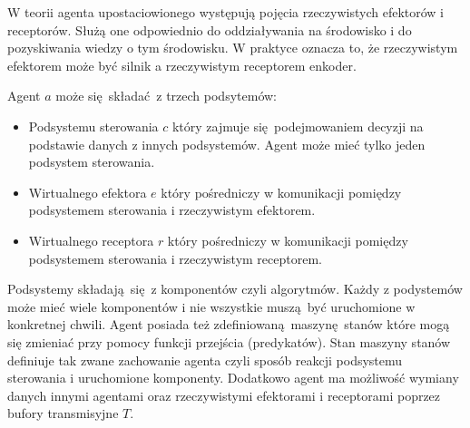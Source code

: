 W teorii agenta upostaciowionego występują pojęcia rzeczywistych efektorów i receptorów. Służą one odpowiednio do oddziaływania na środowisko i do pozyskiwania wiedzy o tym środowisku. W praktyce oznacza to, że rzeczywistym efektorem może być silnik a rzeczywistym receptorem enkoder. 

Agent $a$ może się składać z trzech podsytemów:
\begin{itemize}
	\item Podsystemu sterowania $c$ który zajmuje się podejmowaniem decyzji na podstawie danych z innych podsystemów. Agent może mieć tylko jeden podsystem sterowania.
	\item Wirtualnego efektora $e$ który pośredniczy w komunikacji pomiędzy podsystemem sterowania i rzeczywistym efektorem.
	\item Wirtualnego receptora $r$ który pośredniczy w komunikacji pomiędzy podsystemem sterowania i rzeczywistym receptorem.
\end{itemize}
Podsystemy składają się z komponentów czyli algorytmów. Każdy z podystemów może mieć wiele komponentów i nie wszystkie muszą być uruchomione w konkretnej chwili. Agent posiada też zdefiniowaną maszynę stanów które mogą się zmieniać przy pomocy funkcji przejścia (predykatów). Stan maszyny stanów definiuje tak zwane zachowanie agenta czyli sposób reakcji podsystemu sterowania i uruchomione komponenty. Dodatkowo agent ma możliwość wymiany danych innymi agentami oraz rzeczywistymi efektorami i receptorami poprzez bufory transmisyjne $T$. 